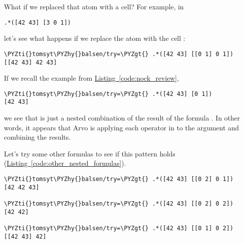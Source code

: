 What if we replaced that atom with a cell? For example, in

\begin{framed_shaded}
\begin{Verbatim}[fontsize=\relsize{-2.5},commandchars=\\\{\}]
.*([42 43] [3 0 1])
\end{Verbatim}
\end{framed_shaded}

let's see what happens if we replace the atom  with the cell \kode{[0 1]}:

\begin{framed_shaded}
\begin{Verbatim}[fontsize=\relsize{-2.5},commandchars=\\\{\}]
\PYZti{}tomsyt\PYZhy{}balsen/try=\PYZgt{} .*([42 43] [[0 1] 0 1])
[[42 43] 42 43]
\end{Verbatim}
\end{framed_shaded}

If we recall the  example from \hyperref[code:nock_review]{Listing~\ref{code:nock_review}},

\begin{framed_shaded}
\begin{Verbatim}[fontsize=\relsize{-2.5},commandchars=\\\{\}]
\PYZti{}tomsyt\PYZhy{}balsen/try=\PYZgt{} .*([42 43] [0 1])
[42 43]
\end{Verbatim}
\end{framed_shaded}

we see that  is just a nested combination of the result of the formula . In other words, it appears that Arvo is applying each operator in \kode{[[0 1] 0 1]} to the argument \kode{[42 43]} and combining the results.

Let's try some other formulas to see if this pattern holds (\hyperref[code:other_nested_formulas]{Listing~\ref{code:other_nested_formulas}}).

\begin{codelisting}
\label{code:other_nested_formulas}
\begin{Verbatim}[fontsize=\relsize{-2.5},commandchars=\\\{\}]
\PYZti{}tomsyt\PYZhy{}balsen/try=\PYZgt{} .*([42 43] [[0 2] 0 1])
[42 42 43]

\PYZti{}tomsyt\PYZhy{}balsen/try=\PYZgt{} .*([42 43] [[0 2] 0 2])
[42 42]

\PYZti{}tomsyt\PYZhy{}balsen/try=\PYZgt{} .*([42 43] [[0 1] 0 2])
[[42 43] 42]
\end{Verbatim}
\end{codelisting}


